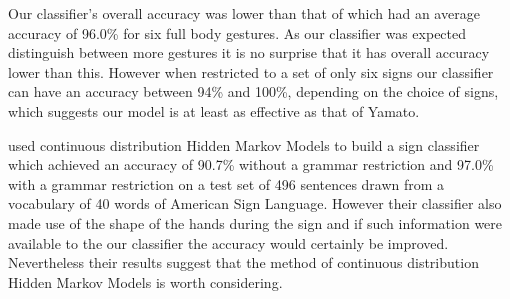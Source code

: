 Our classifier's overall accuracy was lower than that of \citet{yamato1992recognizing} which had an average accuracy of 96.0\% for six full body gestures. As our classifier was expected distinguish between more gestures it is no surprise that it has overall accuracy lower than this. However when restricted to a set of only six signs our classifier can have an accuracy between 94\% and 100\%, depending on the choice of signs, which suggests our model is at least as effective as that of Yamato.

\citet{starner1995real} used continuous distribution Hidden Markov Models to build a sign classifier which achieved an accuracy of 90.7\% without a grammar restriction and 97.0\% with a grammar restriction on a test set of 496 sentences drawn from a vocabulary of 40 words of American Sign Language. However their classifier also made use of the shape of the hands during the sign and if such information were available to the our classifier the accuracy would certainly be improved. Nevertheless their results suggest that the method of continuous distribution Hidden Markov Models is worth considering.




